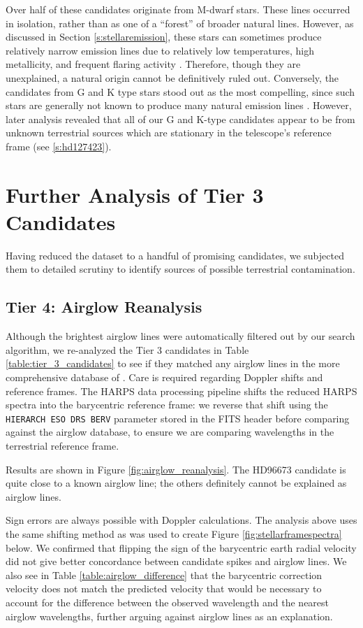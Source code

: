 \documentclass[twocolumn]{aastex701}
\begin{document}
Over half of these candidates originate from M-dwarf stars. These lines occurred in isolation, rather than as one of a ``forest'' of broader natural lines. However, as discussed in Section \ref{s:stellaremission}, these stars can sometimes produce relatively narrow emission lines due to relatively low temperatures, high metallicity, and frequent flaring activity \citep{Marcy_2021}. Therefore, though they are unexplained, a natural origin cannot be definitively ruled out. Conversely, the candidates from G and K type stars stood out as the most compelling, since such stars are generally not known to produce many natural emission lines \citep{stellar_emission_linesJ}. However, later analysis revealed that all of our G and K-type candidates appear to be from unknown terrestrial sources which are stationary in the telescope's reference frame (see \ref{s:hd127423}).

\section{Further Analysis of Tier 3 Candidates}

Having reduced the dataset to a handful of promising candidates, we subjected them to detailed scrutiny to identify sources of possible terrestrial contamination.

\subsection{Tier 4: Airglow Reanalysis}
\label{s:airglow_reanalysis}

Although the brightest airglow lines were automatically filtered out by our search algorithm, we re-analyzed the Tier 3 candidates in Table \ref{table:tier_3_candidates} to see if they matched any airglow lines in the more comprehensive database of \cite{faint_airglow_database}.  Care is required regarding Doppler shifts and reference frames. The HARPS data processing pipeline shifts the reduced HARPS spectra into the barycentric reference frame: we reverse that shift using the \texttt{HIERARCH ESO DRS BERV} parameter stored in the FITS header before comparing against the airglow database, to ensure we are comparing wavelengths in the terrestrial reference frame.

Results are shown in Figure \ref{fig:airglow_reanalysis}. The HD96673 candidate is quite close to a known airglow line; the others definitely cannot be explained as airglow lines.

Sign errors are always possible with Doppler calculations.  The analysis above uses the same shifting method as was used to create Figure \ref{fig:stellarframespectra} below.  We confirmed that flipping the sign of the barycentric earth radial velocity did not give better concordance between candidate spikes and airglow lines. We also see in Table \ref{table:airglow_difference} that the barycentric correction velocity does not match the predicted velocity that would be necessary to account for the difference between the observed wavelength and the nearest airglow wavelengths, further arguing against airglow lines as an explanation.
\end{document}
